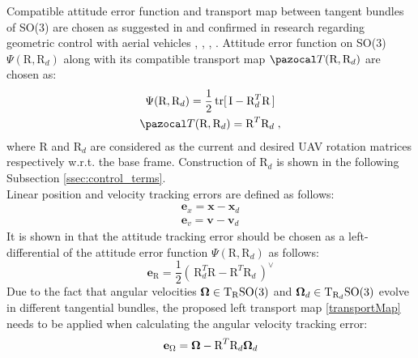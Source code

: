 Compatible attitude error function and transport map between tangent bundles of SO(3) are chosen as suggested in \cite{bulloBook} and confirmed in research regarding geometric control with aerial vehicles \cite{LeeClanak4}, \cite{LeeClanak3}, \cite{LeeClanak1}, \cite{LeeClanak2}.  Attitude error function on SO(3) $	\Psi(\text{R}, \text{R}_d)$  along with its compatible transport map $\Ta(\text{R}, \text{R}_d)$ are chosen as:
\begin{gather}
	\Psi(\text{R}, \text{R}_d) = \frac{1}{2} \, \text{tr} [\, \text{I} - \text{R}_d^T\text{R} \,] \label{attErr} \\ 
	\Ta(\text{R}, \text{R}_d) = \text{R}^T \text{R}_d \label{transportMap} \;,
\end{gather}
where R and $\text{R}_d$ are considered as the current and desired UAV rotation matrices respectively w.r.t. the base frame. Construction of $\text{R}_d$ is shown in the following Subsection \ref{ssec:control_terms}. \\
Linear position and velocity tracking errors are defined as follows:
\begin{gather}
	\textbf{e}_x = \textbf{x} - \textbf{x}_d \\
	\textbf{e}_v = \textbf{v} - \textbf{v}_d \label{linear_error}
\end{gather}
It is shown in \cite{bulloBook} that the attitude tracking error should be chosen as a left-differential of the attitude error function $\Psi(\text{R}, \text{R}_d)$ as follows:
\begin{equation}
	\textbf{e}_\text{R} = \frac{1}{2} (\, \text{R}_d^T\text{R} - \text{R}^T\text{R}_d \,)^\vee
\end{equation}
Due to the fact that angular velocities $\boldsymbol{\Omega} \in \text{T}_\text{R} \text{SO}(3)$ and $\boldsymbol{\Omega}_d \in \text{T}_{\text{R}_d}\text{SO}(3)$ evolve in different tangential bundles, the proposed left transport map \eqref{transportMap} needs to be applied when calculating the angular velocity tracking error:
\begin{equation}
	\textbf{e}_\Omega = \boldsymbol{\Omega} - \text{R}^T\text{R}_d\boldsymbol{\Omega}_d \label{angular_error}
\end{equation}

